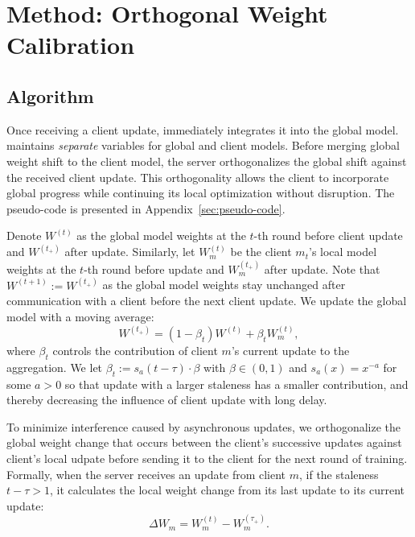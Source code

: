 \section{Method: Orthogonal Weight Calibration}
\subsection{\our Algorithm}
\label{sec:method}

Once receiving a client update, \our immediately integrates it into the global model. 
\our maintains \emph{separate} variables for global and client models. 
Before merging global weight shift to the client model, the server orthogonalizes the global shift against the received client update. This orthogonality allows the client to incorporate global progress while continuing its local optimization without disruption. The pseudo-code is presented in Appendix~\ref{sec:pseudo-code}. 

Denote $W^{(t)}$ as the global model weights at the $t$-th round before client update and $W^{(t_+)}$ after update. Similarly, let $W_m^{(t)}$ be the client $m_t$'s local model weights at the $t$-th round before update and $W_m^{(t_+)}$ after update. Note that $W^{(t+1)} := W^{(t_+)}$ as the global model weights stay unchanged after communication with a client before the next client update. We update the global model with a moving average:
\begin{equation}
    W^{(t_+)} = (1-\beta_t) W^{(t)} + \beta_t W_m^{(t)},
\label{eq:aggregation}
\end{equation}
where $\beta_t$ controls the contribution of client $m$'s current update to the aggregation. We let $\beta_t := s_a(t-\tau) \cdot \beta$ with $\beta \in (0,1)$ and $s_a(x) = x^{-a}$ for some $a > 0$ so that update with a larger staleness has a smaller contribution, and thereby decreasing the influence of client update with long delay.

To minimize interference caused by asynchronous updates, we orthogonalize the global weight change that occurs between the client's successive updates against client's local udpate before sending it to the client for the next round of training.
Formally, when the server receives an update from client $m$, if the staleness $t - \tau > 1$, it calculates the local weight change from its last update to its current update:
\begin{equation}
  \Delta W_m = W_m^{(t)} - W_m^{(\tau_+)} .
\end{equation}


